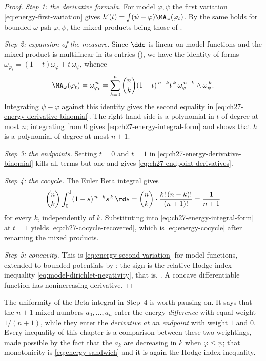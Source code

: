\begin{proof}
\emph{Step 1: the derivative formula.}
For model \(\varphi,\psi\) the first variation
\eqref{eq:energy-first-variation} gives
\(h'(t)=\int(\psi-\varphi)\MA_\omega(\varphi_t)\).  By
 the same holds for bounded
\(\omega\)-psh \(\varphi,\psi\), the mixed products being those of
.

\emph{Step 2: expansion of the measure.}
Since \(\ddc\) is linear on model functions and the mixed product is
multilinear in its entries (), we have
the identity of forms
\(\omega_{\varphi_t}=(1-t)\omega_\varphi+t\,\omega_\psi\), whence
\[
 \MA_\omega(\varphi_t)=\omega_{\varphi_t}^{\,n}
 =\sum_{k=0}^n\binom nk(1-t)^{\,n-k}t^{\,k}\,
   \omega_\varphi^{\,n-k}\wedge\omega_\psi^{\,k}.
\]
Integrating \(\psi-\varphi\) against this identity gives the second equality
in \eqref{eq:ch27-energy-derivative-binomial}.  The right-hand side is a
polynomial in \(t\) of degree at most \(n\); integrating from \(0\) gives
\eqref{eq:ch27-energy-integral-form} and shows that \(h\) is a polynomial of
degree at most \(n+1\).

\emph{Step 3: the endpoints.}
Setting \(t=0\) and \(t=1\) in
\eqref{eq:ch27-energy-derivative-binomial} kills all terms but one and gives
\eqref{eq:ch27-endpoint-derivatives}.

\emph{Step 4: the cocycle.}
The Euler Beta integral gives
\[
 \binom nk\int_0^1(1-s)^{\,n-k}s^{\,k}\,\rd s
 =\binom nk\cdot\frac{k!\,(n-k)!}{(n+1)!}
 =\frac1{n+1}
\]
for every \(k\), independently of \(k\).  Substituting into
\eqref{eq:ch27-energy-integral-form} at \(t=1\) yields
\eqref{eq:ch27-cocycle-recovered}, which is
\eqref{eq:energy-cocycle} after renaming the mixed products.

\emph{Step 5: concavity.}
This is \eqref{eq:energy-second-variation} for model functions, extended to
bounded potentials by ; the sign is the
relative Hodge index inequality \eqref{eq:model-dirichlet-negativity}, that
is, .  A concave differentiable function has
nonincreasing derivative.
\end{proof}

\begin{remark}
\label{rem:ch27-beta-identity}
The uniformity of the Beta integral in Step~4 is worth pausing on.  It says
that the \(n+1\) mixed numbers \(a_0,\dots,a_n\) enter the energy
\emph{difference} with equal weight \(1/(n+1)\), while they enter the
\emph{derivative at an endpoint} with weight \(1\) and \(0\).  Every
inequality of this chapter is a comparison between these two weightings,
made possible by the fact that the \(a_k\) are decreasing in \(k\) when
\(\varphi\leq\psi\); that monotonicity is \eqref{eq:energy-sandwich} and it
is again the Hodge index inequality.
\end{remark}

